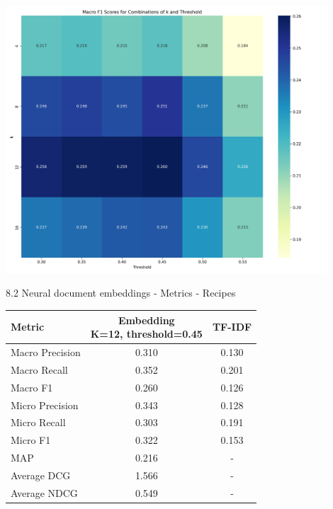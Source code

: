 \documentclass{beamer}
\begin{document}
\begin{frame}
  \centering
  \includegraphics[width=0.9\textwidth]{recipies_embeddings_heatmap.png_1747347706.png}
\end{frame}


\begin{frame}{8.2 Neural document embeddings - Metrics - Recipes}
  \begin{table}
    \centering
    \begin{tabular}{|l|c|c|}
      \hline
      Metric          & \makecell{Embedding         \\K=12, threshold=0.45} & TF-IDF \\
      \hline
      Macro Precision & 0.310               & 0.130 \\
      Macro Recall    & 0.352               & 0.201 \\
      Macro F1        & 0.260               & 0.126 \\
      Micro Precision & 0.343               & 0.128 \\
      Micro Recall    & 0.303               & 0.191 \\
      Micro F1        & 0.322               & 0.153 \\
      MAP             & 0.216               & -     \\
      Average DCG     & 1.566               & -     \\
      Average NDCG    & 0.549               & -     \\
      \hline
    \end{tabular}
  \end{table}
\end{frame}
\end{document}
